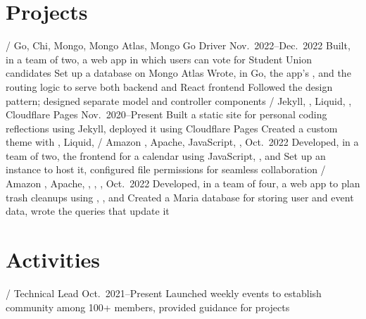 \section{Projects}
\begin{outline}
     / Go, Chi, Mongo, Mongo Atlas, Mongo Go Driver
    \hfill Nov.\ 2022--Dec.\ 2022
        \1 Built, in a team of two, a web app in which users can vote for Student Union candidates
            \2 Set up a database on Mongo Atlas
            \2 Wrote, in Go, the app's  , and the routing logic to serve both backend and React frontend
            \2 Followed the  design pattern; designed separate model and controller components
     / Jekyll, , Liquid, , Cloudflare Pages
    \hfill Nov.\ 2020--Present
        \1 Built a static site for personal coding reflections using Jekyll, deployed it using Cloudflare Pages
            \2 Created a custom theme with , Liquid, 
     / Amazon , Apache, JavaScript, , 
    \hfill Oct.\ 2022
        \1 Developed, in a team of two, the frontend for a calendar using JavaScript, , and 
            \2 Set up an  instance to host it, configured file permissions for seamless collaboration
     / Amazon , Apache, , , , 
    \hfill Oct.\ 2022
        \1 Developed, in a team of four, a web app to plan trash cleanups using , , and 
            \2 Created a Maria database for storing user and event data, wrote the  queries that update it
\end{outline}

\section{Activities}
\begin{outline}
     / Technical Lead
    \hfill Oct.\ 2021--Present
        \1 Launched weekly events to establish community among 100+ members, provided guidance for  projects
\end{outline}
